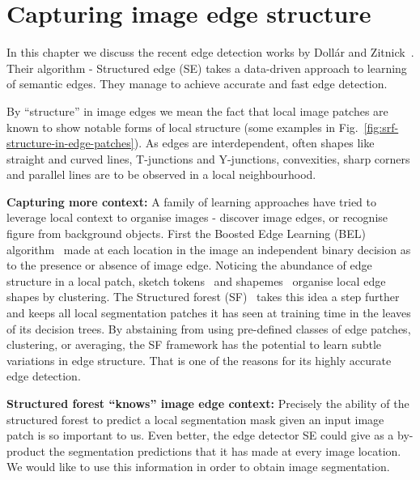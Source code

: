 \chapter{Capturing image edge structure} %
\label{Chapter2}
In this chapter we discuss the recent edge detection works by Doll\'ar and Zitnick~\cite{DollarICCV13edges,Dollar2014fast}. Their algorithm - Structured edge (SE) takes a data-driven approach to learning of semantic edges. %
They manage to achieve accurate and fast edge detection. %

By ``structure'' in image edges %
we mean the fact that local image patches are known \cite{Ren2006figure,LimZD13} to show %
notable %
forms of local structure (some examples in Fig.~\ref{fig:srf-structure-in-edge-patches}). As edges are interdependent, often shapes like straight and curved lines, T-junctions and Y-junctions, convexities, sharp corners and parallel lines are to be observed in a local neighbourhood.

\textbf{Capturing more context:} A family of learning approaches have tried to leverage local context to organise images - discover image edges, or recognise %
figure from background objects. First the Boosted Edge Learning (BEL) algorithm~\cite{dollar2006supervised} made at each location in the image an independent binary decision as to the presence or absence of image edge. Noticing the abundance of edge structure in a local patch, sketch tokens~\cite{LimZD13} and shapemes~\cite{Ren2006figure} organise local edge shapes by clustering. The Structured forest (SF)~\cite{DollarICCV13edges} takes this idea a step further and keeps all local segmentation patches it has seen at training time in the leaves of its decision trees. By abstaining from using pre-defined classes of edge patches, clustering, or averaging, the SF framework has the potential to learn subtle variations in edge structure. That is one of the reasons for its highly accurate edge detection.

\textbf{Structured forest ``knows'' image edge context:} Precisely the ability of the structured forest to predict a local segmentation mask given an input image patch is so important to us. Even better, the edge detector SE could give as a by-product the segmentation predictions that it has made at every image location. We would like to use this information in order to obtain image segmentation.

